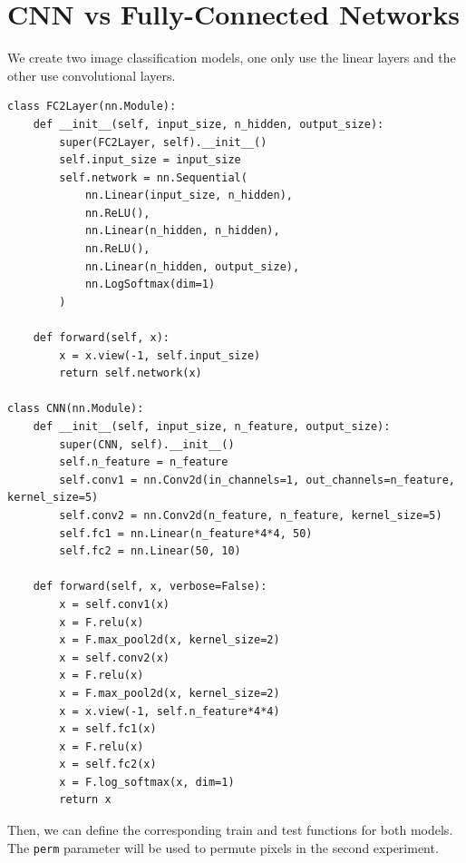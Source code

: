     \section{CNN vs Fully-Connected Networks}
        We create two image classification models, one only use the linear layers and the other use convolutional layers.
        \begin{verbatim}
class FC2Layer(nn.Module):
    def __init__(self, input_size, n_hidden, output_size):
        super(FC2Layer, self).__init__()
        self.input_size = input_size
        self.network = nn.Sequential(
            nn.Linear(input_size, n_hidden), 
            nn.ReLU(), 
            nn.Linear(n_hidden, n_hidden), 
            nn.ReLU(), 
            nn.Linear(n_hidden, output_size), 
            nn.LogSoftmax(dim=1)
        )

    def forward(self, x):
        x = x.view(-1, self.input_size)
        return self.network(x)
    
class CNN(nn.Module):
    def __init__(self, input_size, n_feature, output_size):
        super(CNN, self).__init__()
        self.n_feature = n_feature
        self.conv1 = nn.Conv2d(in_channels=1, out_channels=n_feature, kernel_size=5)
        self.conv2 = nn.Conv2d(n_feature, n_feature, kernel_size=5)
        self.fc1 = nn.Linear(n_feature*4*4, 50)
        self.fc2 = nn.Linear(50, 10)
        
    def forward(self, x, verbose=False):
        x = self.conv1(x)
        x = F.relu(x)
        x = F.max_pool2d(x, kernel_size=2)
        x = self.conv2(x)
        x = F.relu(x)
        x = F.max_pool2d(x, kernel_size=2)
        x = x.view(-1, self.n_feature*4*4)
        x = self.fc1(x)
        x = F.relu(x)
        x = self.fc2(x)
        x = F.log_softmax(x, dim=1)
        return x
        \end{verbatim}
        Then, we can define the corresponding train and test functions for both models.
        The \texttt{perm} parameter will be used to permute pixels in the second experiment.

